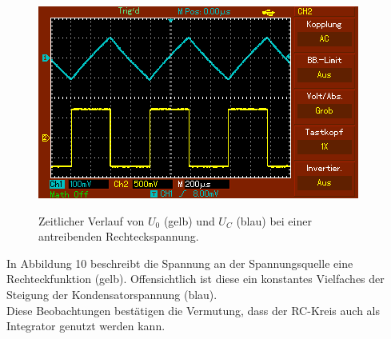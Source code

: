 	 \begin{figure}[H]
	 	\centering
	 	\caption{Zeitlicher Verlauf von $U_0$ (gelb) und $U_C$ (blau) bei einer antreibenden Rechteckspannung.}
	 	\includegraphics[width=\linewidth-70pt,height=\textheight-70pt,keepaspectratio]{content/MAP004.png}
	 	\label{fig:Rechteck}
	 \end{figure}
	 In Abbildung 10 beschreibt die Spannung an der Spannungsquelle eine Rechteckfunktion (gelb). Offensichtlich ist diese ein konstantes Vielfaches der Steigung der Kondensatorspannung (blau).\\

	 Diese Beobachtungen bestätigen die Vermutung, dass der RC-Kreis auch als Integrator genutzt werden kann.
